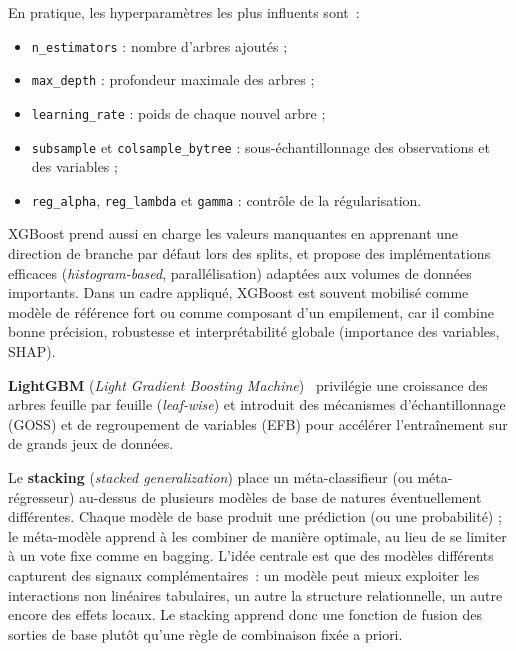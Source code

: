 En pratique, les hyperparam\`etres les plus influents sont~:
\begin{itemize}
    \item \texttt{n\_estimators} : nombre d'arbres ajout\'es ;
    \item \texttt{max\_depth} : profondeur maximale des arbres ;
    \item \texttt{learning\_rate} : poids de chaque nouvel arbre ;
    \item \texttt{subsample} et \texttt{colsample\_bytree} : sous-\'echantillonnage des observations et des variables ;
    \item \texttt{reg\_alpha}, \texttt{reg\_lambda} et \texttt{gamma} : contr\^ole de la r\'egularisation.
\end{itemize}
XGBoost prend aussi en charge les valeurs manquantes en apprenant une direction de branche par d\'efaut lors des splits, et propose des impl\'ementations efficaces (\emph{histogram-based}, parall\'elisation) adapt\'ees aux volumes de donn\'ees importants.
Dans un cadre appliqu\'e, XGBoost est souvent mobilis\'e comme mod\`ele de r\'ef\'erence fort ou comme composant d'un empilement, car il combine bonne pr\'ecision, robustesse et interpr\'etabilit\'e globale (importance des variables, SHAP).

\textbf{LightGBM} (\emph{Light Gradient Boosting Machine})~\cite{ke2017lightgbm} privil\'egie une croissance des arbres feuille par feuille (\emph{leaf-wise}) et introduit des m\'ecanismes d'\'echantillonnage (GOSS) et de regroupement de variables (EFB) pour acc\'el\'erer l'entra\^inement sur de grands jeux de donn\'ees.




\label{sec:stacking}

Le \textbf{stacking} (\emph{stacked generalization}) place un m\'eta-classifieur (ou m\'eta-r\'egresseur) au-dessus de plusieurs mod\`eles de base de natures \'eventuellement diff\'erentes.
Chaque mod\`ele de base produit une pr\'ediction (ou une probabilit\'e) ; le m\'eta-mod\`ele apprend \`a les combiner de mani\`ere optimale, au lieu de se limiter \`a un vote fixe comme en bagging.
L'id\'ee centrale est que des mod\`eles diff\'erents capturent des signaux compl\'ementaires~: un mod\`ele peut mieux exploiter les interactions non lin\'eaires tabulaires, un autre la structure relationnelle, un autre encore des effets locaux.
Le stacking apprend donc une fonction de fusion des sorties de base plut\^ot qu'une r\`egle de combinaison fix\'ee a priori.

